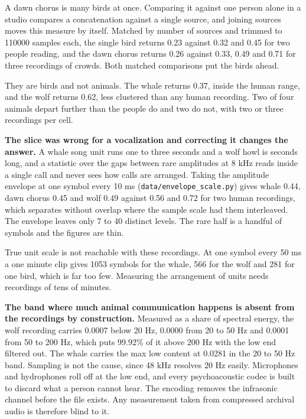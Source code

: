 A dawn chorus is many birds at once. Comparing it against one person alone in a studio compares a concatenation against a single source, and joining sources moves this measure by itself. Matched by number of sources and trimmed to 110000 samples each, the single bird returns 0.23 against 0.32 and 0.45 for two people reading, and the dawn chorus returns 0.26 against 0.33, 0.49 and 0.71 for three recordings of crowds. Both matched comparisons put the birds ahead.

They are birds and not animals. The whale returns 0.37, inside the human range, and the wolf returns 0.62, less clustered than any human recording. Two of four animals depart further than the people do and two do not, with two or three recordings per cell.

\textbf{The slice was wrong for a vocalization and correcting it changes the answer.} A whale song unit runs one to three seconds and a wolf howl is seconds long, and a statistic over the gaps between rare amplitudes at 8 kHz reads inside a single call and never sees how calls are arranged. Taking the amplitude envelope at one symbol every 10 ms (\texttt{data/\allowbreak{}envelope\_\allowbreak{}scale.\allowbreak{}py}) gives whale 0.44, dawn chorus 0.45 and wolf 0.49 against 0.56 and 0.72 for two human recordings, which separates without overlap where the sample scale had them interleaved. The envelope leaves only 7 to 40 distinct levels. The rare half is a handful of symbols and the figures are thin.

True unit scale is not reachable with these recordings. At one symbol every 50 ms a one minute clip gives 1053 symbols for the whale, 566 for the wolf and 281 for one bird, which is far too few. Measuring the arrangement of units needs recordings of tens of minutes.

\textbf{The band where much animal communication happens is absent from the recordings by construction.} Measured as a share of spectral energy, the wolf recording carries 0.0007 below 20 Hz, 0.0000 from 20 to 50 Hz and 0.0001 from 50 to 200 Hz, which puts 99.92\% of it above 200 Hz with the low end filtered out. The whale carries the max low content at 0.0281 in the 20 to 50 Hz band. Sampling is not the cause, since 48 kHz resolves 20 Hz easily. Microphones and hydrophones roll off at the low end, and every psychoacoustic codec is built to discard what a person cannot hear. The encoding removes the infrasonic channel before the file exists. Any measurement taken from compressed archival audio is therefore blind to it.

